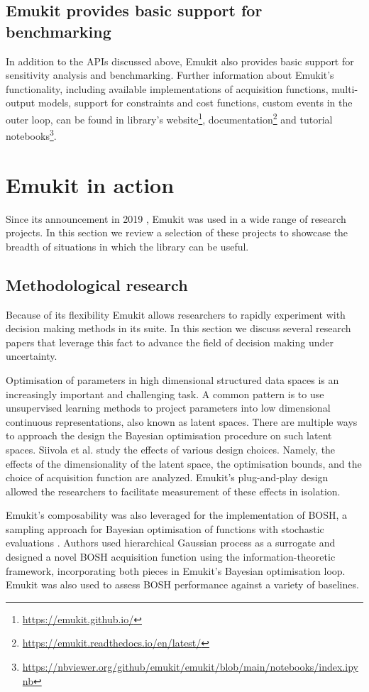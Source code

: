 \subsection{Emukit provides basic support for benchmarking}
In addition to the APIs discussed above, Emukit also provides basic support for sensitivity analysis and benchmarking. Further information about Emukit's functionality, including available implementations of acquisition functions, multi-output models, support for constraints and cost functions, custom events in the outer loop, can be found in library's website\footnote{\url{https://emukit.github.io/}}, documentation\footnote{\url{https://emukit.readthedocs.io/en/latest/}} and tutorial notebooks\footnote{\url{https://nbviewer.org/github/emukit/emukit/blob/main/notebooks/index.ipynb}}. 

\section{Emukit in action}
Since its announcement in 2019 \cite{paleyes2019emulation}, Emukit was used in a wide range of research projects. In this section we review a selection of these projects to showcase the breadth of situations in which the library can be useful.

\subsection{Methodological research}
Because of its flexibility Emukit allows researchers to rapidly experiment with decision making methods in its suite. In this section we discuss several research papers that leverage this fact to advance the field of decision making under uncertainty.

Optimisation of parameters in high dimensional structured data spaces is an increasingly important and challenging task. A common pattern is to use unsupervised learning methods to project parameters into low dimensional continuous representations, also known as latent spaces. There are multiple ways to approach the design the Bayesian optimisation procedure on such latent spaces. Siivola et al. \cite{siivola2021good} study the effects of various design choices. Namely, the effects of the dimensionality of the latent space, the optimisation bounds, and the choice of acquisition function are analyzed. Emukit's plug-and-play design allowed the researchers to facilitate measurement of these effects in isolation.

Emukit's composability was also leveraged for the implementation of BOSH, a sampling approach for Bayesian optimisation of functions with stochastic evaluations \cite{moss2020bosh}. Authors used hierarchical Gaussian process as a surrogate and designed a novel BOSH acquisition function using the information-theoretic framework, incorporating both pieces in Emukit's Bayesian optimisation loop. Emukit was also used to assess BOSH performance against a variety of baselines.

